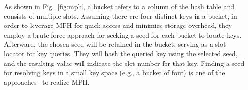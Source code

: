 As shown in Fig.~\ref{fig:mph}, a bucket refers to a column of the hash table and consists of multiple slots.
Assuming there are four distinct keys in a bucket, in order to leverage MPH for quick access and minimize storage overhead, they employ a brute-force approach for seeking a seed for each bucket to locate keys. 
Afterward, the chosen seed will be retained in the bucket, serving as a slot locator for key queries. They will hash the queried key using the selected seed, and the resulting value will indicate the slot number for that key.
Finding a seed for resolving keys in a small key space (e.g., a bucket of four) is one of the approaches~\cite{scalebricks,ludo} to realize MPH. 


